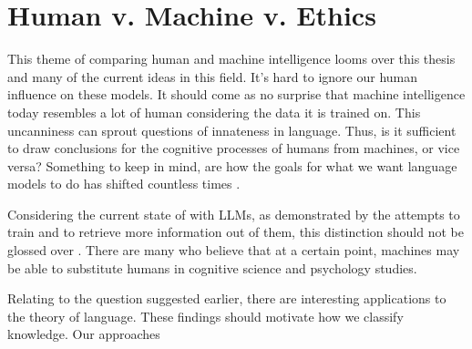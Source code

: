 \documentclass{brandeis-thesis3.2}
\theoremstyle{plain}
\theoremstyle{definition}
\theoremstyle{remark}
\numberwithin{equation}{section}
\renewcommand\cite{\citep}
\begin{document}
\section{Human v. Machine v. Ethics}
This theme of comparing human and machine intelligence looms over this thesis and many of the current ideas in this field. It's hard to ignore our human influence on these models. It should come as no surprise that machine intelligence today resembles a lot of human considering the data it is trained on. This uncanniness can sprout questions of innateness in language. Thus, is it sufficient to draw conclusions for the cognitive processes of humans from machines, or vice versa? Something to keep in mind, are how the goals for what we want language models to do has shifted countless times \cite{portelance_roles_2024}. 

Considering the current state of with LLMs, as demonstrated by the attempts to train and to retrieve more information out of them, this distinction should not be glossed over \cite{warstadt_findings_2023, webson_prompt-based_2022}. There are many who believe that at a certain point, machines may be able to substitute humans in cognitive science and psychology studies. 

Relating to the question suggested earlier, there are interesting applications to the theory of language. These findings should motivate how we classify knowledge. Our approaches 

\begin{singlespacing}


\end{singlespacing}


\appendix
\end{document}
